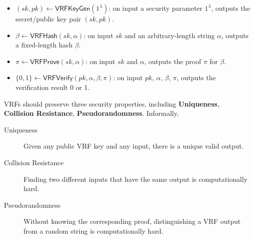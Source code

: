 \begin{itemize}
    \item $(sk, pk) \gets \mathsf{VRFKeyGen}(1^{\lambda})$: on input a security parameter $1^{\lambda}$, outputs the secret/public key pair $(sk, pk)$.
    \item $\beta \gets \mathsf{VRFHash}(sk, \alpha)$: on input $sk$ and an arbitrary-length string $\alpha$, outputs a fixed-length hash $\beta$.
    \item $\pi \gets \mathsf{VRFProve}(sk, \alpha)$: on input $sk$ and $\alpha$, outputs the proof $\pi$ for $\beta$.
    \item $\{0, 1\} \gets \mathsf{VRFVerify}(pk, \alpha, \beta, \pi)$: on input $pk$, $\alpha$, $\beta$, $\pi$, outputs the verification result 0 or 1.
\end{itemize}

VRFs should preserve three security properties, including \textbf{Uniqueness}, \textbf{Collision Resistance}, \textbf{Pseudorandomness}. Informally, 

\begin{description}
    \item[Uniqueness] Given any public VRF key and any input, there is a unique valid output.
    \item[Collision Resistance] Finding two different inputs that have the same output is computationally hard.
    \item[Pseudorandomness] Without knowing the corresponding proof, distinguishing a VRF output from a random string is computationally hard.
\end{description}

